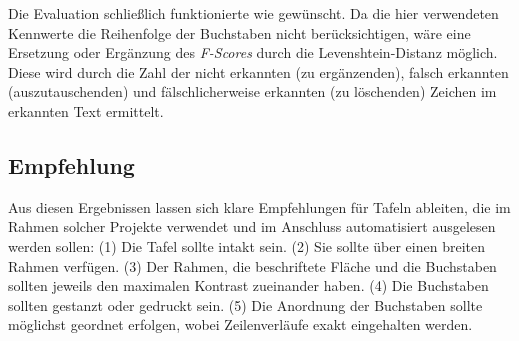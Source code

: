 Die Evaluation schließlich funktionierte wie gewünscht. Da die hier verwendeten Kennwerte die Reihenfolge der Buchstaben nicht berücksichtigen, wäre eine Ersetzung oder Ergänzung des \textit{F-Scores} durch die Levenshtein-Distanz möglich. Diese wird durch die Zahl der nicht erkannten (zu ergänzenden), falsch erkannten (auszutauschenden) und fälschlicherweise erkannten (zu löschenden) Zeichen im erkannten Text ermittelt\cite{Levenshtein_SPD66}.
\subsection{Empfehlung}
Aus diesen Ergebnissen lassen sich klare Empfehlungen für Tafeln ableiten, die im Rahmen solcher Projekte verwendet und im Anschluss automatisiert ausgelesen werden sollen: (1) Die Tafel sollte intakt sein. (2) Sie sollte über einen breiten Rahmen verfügen. (3) Der Rahmen, die beschriftete Fläche und die Buchstaben sollten jeweils den maximalen Kontrast zueinander haben. (4) Die Buchstaben sollten gestanzt oder gedruckt sein. (5) Die Anordnung der Buchstaben sollte möglichst geordnet erfolgen, wobei Zeilenverläufe exakt eingehalten werden.